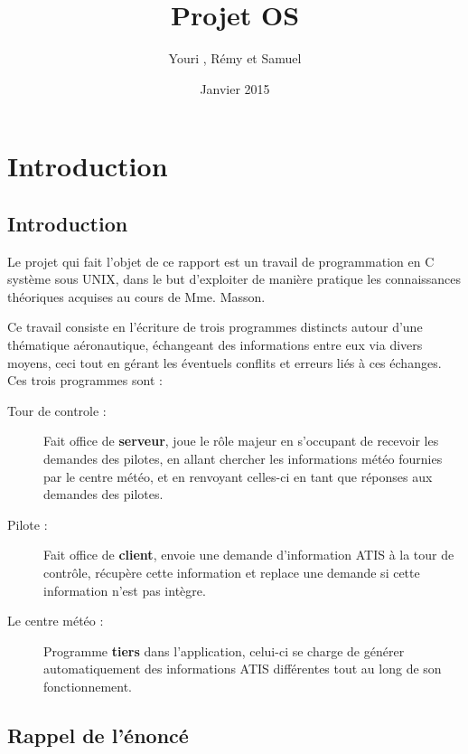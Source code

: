 \documentclass{report}
\title{Projet OS}
\author{Youri \bsc{Mouton}, Rémy \bsc{Voet} et Samuel \bsc{Monroe}}
\date{Janvier 2015}
\begin{document}
\maketitle

\chapter{Introduction}

	\section{Introduction}

		Le projet qui fait l'objet de ce rapport est un travail de programmation
		en C système sous UNIX, dans le but d'exploiter de manière pratique les connaissances théoriques acquises au cours de Mme. Masson.
		\newline

		Ce travail consiste en l'écriture de trois programmes distincts autour d'une thématique aéronautique, échangeant des informations entre eux via divers moyens, ceci tout en gérant les éventuels conflits et erreurs liés à ces échanges.\newline
		Ces trois programmes sont :\newline
		\begin{description}
			\item[Tour de controle : ]
			Fait office de \textbf{serveur}, joue le rôle majeur en s'occupant de recevoir les demandes des pilotes, en allant chercher les informations météo fournies par le centre météo, et en renvoyant celles-ci en tant que réponses aux demandes des pilotes.\newline

			\item[Pilote : ]
			Fait office de \textbf{client}, envoie une demande d'information ATIS à la tour de contrôle, récupère cette information et replace une demande si cette information n'est pas intègre.\newline

			\item[Le centre météo : ]
			Programme \textbf{tiers} dans l'application, celui-ci se charge de générer automatiquement des informations ATIS différentes tout au long de son fonctionnement.\newline
		\end{description}

	\section{Rappel de l'énoncé}
\end{document}

